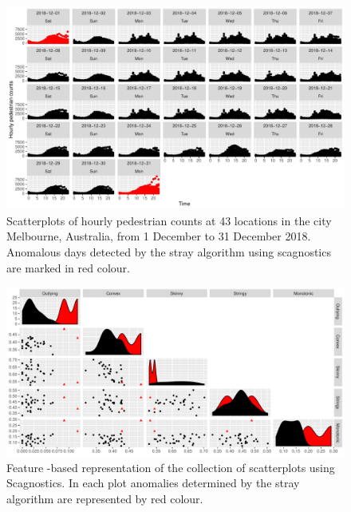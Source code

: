 \documentclass[11pt,a4paper,]{article}
\theoremstyle{definition}
\theoremstyle{definition}
\theoremstyle{definition}
\theoremstyle{remark}
\begin{document}
\begin{figure}[h]

{\centering \includegraphics[width=1\linewidth]{figure/AusiPedestrianSensorData-1} 

}

\caption{Scatterplots of hourly pedestrian counts at 43 locations in the city Melbourne, Australia, from 1 December to 31 December 2018. Anomalous days detected by the stray algorithm using scagnostics are marked in red colour. }\label{fig:AusiPedestrianSensorData}
\end{figure}

\begin{figure}[h]

{\centering \includegraphics[width=1\linewidth]{figure/FeaturePedetrian-1} 

}

\caption{Feature -based representation of the collection of  scatterplots using Scagnostics. In each plot anomalies determined by the stray algorithm are represented by red colour.}\label{fig:FeaturePedetrian}
\end{figure}
\end{document}
